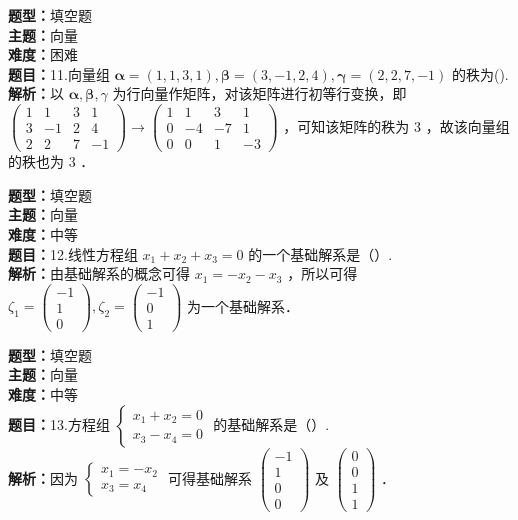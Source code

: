 \documentclass{ctexart}
\newenvironment{question}[5]{%
	\noindent\textbf{题型：}#1\\
	\textbf{主题：}#2\\
	\textbf{难度：}#3\\
	\textbf{题目：}#4\\
	\textbf{解析：}#5\\
	\vspace{1em}
}{}
\begin{document}
	\begin{question}
		{填空题}
		{向量}
		{困难}
		{11.向量组 \(\boldsymbol{\alpha}=(1,1,3,1), \boldsymbol{\beta}=(3,-1,2,4), \boldsymbol{\gamma}=(2,2,7,-1)\) 的秩为(\qquad). }
		{以 \(\boldsymbol{\alpha}, \boldsymbol{\beta}, \gamma\) 为行向量作矩阵，对该矩阵进行初等行变换，即 \(\left(\begin{array}{cccc}1 & 1 & 3 & 1 \\ 3 & -1 & 2 & 4 \\ 2 & 2 & 7 & -1\end{array}\right) \rightarrow\left(\begin{array}{cccc}1 & 1 & 3 & 1 \\ 0 & -4 & -7 & 1 \\ 0 & 0 & 1 & -3\end{array}\right)\) ，可知该矩阵的秩为 3 ，故该向量组的秩也为 3 ．}
	\end{question}
	
	\begin{question}
		{填空题}
		{向量}
		{中等}
		{12.线性方程组 \(x_1+x_2+x_3=0\) 的一个基础解系是（）. }
		{由基础解系的概念可得 \(x_1=-x_2-x_3\) ，所以可得 \(\zeta_1=\left(\begin{array}{c}-1 \\ 1 \\ 0\end{array}\right), \zeta_2=\left(\begin{array}{c}-1 \\ 0 \\ 1\end{array}\right)\) 为一个基础解系．}
	\end{question}
	
	\begin{question}
		{填空题}
		{向量}
		{中等}
		{13.方程组 \(\left\{\begin{array}{l}x_1+x_2=0 \\ x_3-x_4=0\end{array}\right.\) 的基础解系是（）. }
		{因为 \(\left\{\begin{array}{l}x_1=-x_2 \\ x_3=x_4\end{array}\right.\) 可得基础解系 \(\left(\begin{array}{c}-1 \\ 1 \\ 0 \\ 0\end{array}\right)\) 及 \(\left(\begin{array}{l}0 \\ 0 \\ 1 \\ 1\end{array}\right)\) ．}
	\end{question}
	
\end{document}
